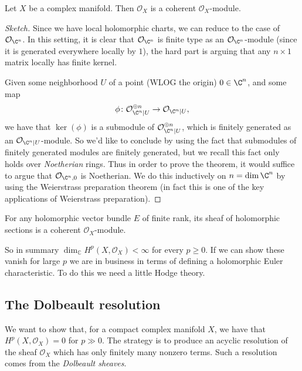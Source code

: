 \documentclass[11pt]{book}
\begin{document}
\begin{theorem} Let $X$ be a complex manifold. Then $\mathcal{O}_X$ is a coherent $\mathcal{O}_X$-module.
\end{theorem}
\begin{proof}[Sketch] Since we have local holomorphic charts, we can reduce to the case of $\mathcal{O}_{\C^n}$. In this setting, it is clear that $\mathcal{O}_{\C^n}$ is finite type as an $\mathcal{O}_{\C^n}$-module (since it is generated everywhere locally by $1$), the hard part is arguing that any $n \times 1$ matrix locally has finite kernel.

Given some neighborhood $U$ of a point (WLOG the origin) $0 \in \C^n$, and some map
\begin{align*}
    \phi \colon \mathcal{O}_{\C^n|U}^{\oplus n} \to \mathcal{O}_{\C^n|U},
\end{align*}
we have that $\ker(\phi)$ is a submodule of $\mathcal{O}_{\C^n|U}^{\oplus n}$, which is finitely generated as an $\mathcal{O}_{\C^n|U}$-module. So we'd like to conclude by using the fact that submodules of finitely generated modules are finitely generated, but we recall this fact only holds over \emph{Noetherian} rings. Thus in order to prove the theorem, it would suffice to argue that $\mathcal{O}_{\C^n,0}$ is Noetherian. We do this inductively on $n = \dim \C^n$ by using the Weierstrass preparation theorem (in fact this is one of the key applications of Weierstrass preparation).
\end{proof}

\begin{example} For any holomorphic vector bundle $E$ of finite rank, its sheaf of holomorphic sections is a coherent $\mathcal{O}_X$-module.
\end{example}

So in summary $\dim_\mathbb{C} H^p(X,\mathcal{O}_X) < \infty$ for every $p\ge 0$. If we can show these vanish for large $p$ we are in business in terms of defining a holomorphic Euler characteristic. To do this we need a little Hodge theory.

\subsection{The Dolbeault resolution}

We want to show that, for a compact complex manifold $X$, we have that $H^p(X,\mathcal{O}_X) = 0$ for $p\gg0$. The strategy is to produce an acyclic resolution of the sheaf $\mathcal{O}_X$ which has only finitely many nonzero terms. Such a resolution comes from the \emph{Dolbeault sheaves}.
\end{document}
